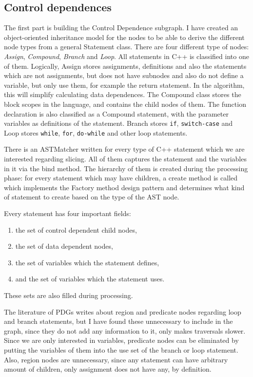 \documentclass[oneside,12pt,a4paper]{book}
\begin{document}
\subsection{Control dependences}

The first part is building the Control Dependence subgraph. I have created an object-oriented inheritance model for the nodes to be able to derive the different node types from a general Statement class. There are four different type of nodes: \textit{Assign}, \textit{Compound}, \textit{Branch} and \textit{Loop}. All statements in C++ is classified into one of them. Logically, Assign stores assignments, definitions and also the statements which are not assignments, but does not have subnodes and also do not define a variable, but only use them, for example the return statement. In the algorithm, this will simplify calculating data dependences. The Compound class stores the block scopes in the language, and contains the child nodes of them. The function declaration is also classified as a Compound statement, with the parameter variables as definitions of the statement. Branch stores \texttt{if}, \texttt{switch-case} and Loop stores \texttt{while}, \texttt{for}, \texttt{do-while} and other loop statements.

There is an ASTMatcher written for every type of C++ statement which we are interested regarding slicing. All of them captures the statement and the variables in it via the bind method. The hierarchy of them is created during the processing phase: for every statement which may have children, a create method is called which implements the Factory method design pattern and determines what kind of statement to create based on the type of the AST node. 

Every statement has four important fields:
\begin{enumerate}
\item the set of control dependent child nodes,
\item the set of data dependent nodes,
\item the set of variables which the statement defines,
\item and the set of variables which the statement uses.
\end{enumerate}

These sets are also filled during processing.

The literature of PDGs writes about region and predicate nodes regarding loop and branch statements, but I have found these unnecessary to include in the graph, since they do not add any information to it, only makes traversals slower. Since we are only interested in variables, predicate nodes can be eliminated by putting the variables of them into the use set of the branch or loop statement. Also, region nodes are unnecessary, since any statement can have arbitrary amount of children, only assignment does not have any, by definition.
\end{document}
